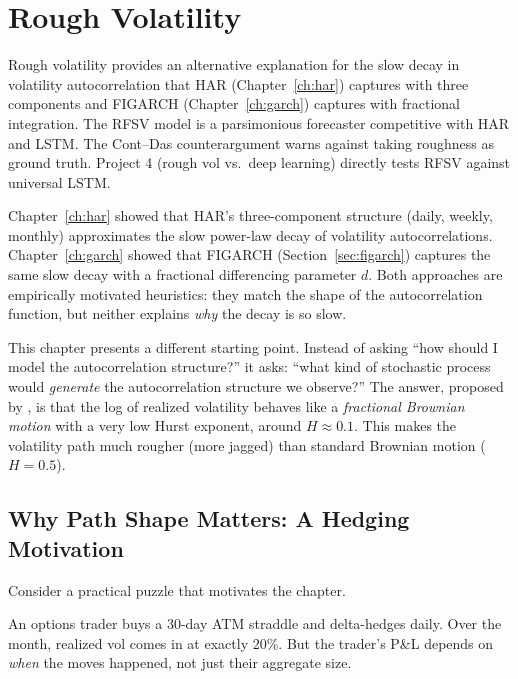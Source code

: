 \chapter{Rough Volatility}
\label{ch:rough}

\begin{application}
Rough volatility provides an alternative explanation for the slow decay in volatility autocorrelation that HAR (Chapter~\ref{ch:har}) captures with three components and FIGARCH (Chapter~\ref{ch:garch}) captures with fractional integration.
The RFSV model is a parsimonious forecaster competitive with HAR and LSTM.
The Cont--Das counterargument warns against taking roughness as ground truth.
Project 4 (rough vol vs.\ deep learning) directly tests RFSV against universal LSTM.
\end{application}

Chapter~\ref{ch:har} showed that HAR's three-component structure (daily, weekly, monthly) approximates the slow power-law decay of volatility autocorrelations.
Chapter~\ref{ch:garch} showed that FIGARCH (Section~\ref{sec:figarch}) captures the same slow decay with a fractional differencing parameter $d$.
Both approaches are empirically motivated heuristics: they match the shape of the autocorrelation function, but neither explains \emph{why} the decay is so slow.

This chapter presents a different starting point.
Instead of asking ``how should I model the autocorrelation structure?'' it asks: ``what kind of stochastic process would \emph{generate} the autocorrelation structure we observe?''
The answer, proposed by \citet{GJR2018}, is that the log of realized volatility behaves like a \emph{fractional Brownian motion} with a very low Hurst exponent, around $H \approx 0.1$.
This makes the volatility path much rougher (more jagged) than standard Brownian motion ($H = 0.5$).

\section{Why Path Shape Matters: A Hedging Motivation}
\label{sec:path-dependence}

Consider a practical puzzle that motivates the chapter.

An options trader buys a 30-day ATM straddle and delta-hedges daily.
Over the month, realized vol comes in at exactly 20\%.
But the trader's P\&L depends on \emph{when} the moves happened, not just their aggregate size.


